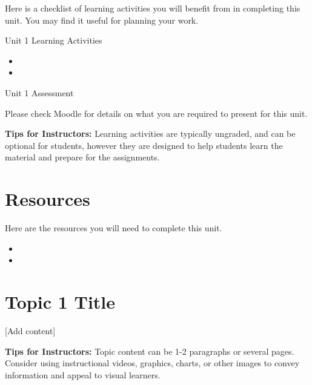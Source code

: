 \documentclass[
]{book}
\providecommand{\tightlist}{%
  \setlength{\itemsep}{0pt}\setlength{\parskip}{0pt}}
\begin{document}
Here is a checklist of learning activities you will benefit from in completing this unit. You may find it useful for planning your work.

\begin{reflect}
{Unit 1 Learning Activities }

\begin{itemize}
\tightlist
\item
\item
\end{itemize}
\end{reflect}

\begin{assessment}
{Unit 1 Assessment}

Please check Moodle for details on what you are required to present for this unit.
\end{assessment}

\begin{feedback}
\textbf{Tips for Instructors:}
Learning activities are typically ungraded, and can be optional for students, however they are designed to help students learn the material and prepare for the assignments.
\end{feedback}

\hypertarget{resources-2}{%
\section*{Resources}\label{resources-2}}

Here are the resources you will need to complete this unit.

\begin{itemize}
\tightlist
\item
\item
\end{itemize}

\hypertarget{topic-1-title}{%
\section{Topic 1 Title}\label{topic-1-title}}

{[}Add content{]}

\begin{feedback}
\textbf{Tips for Instructors:} Topic content can be 1-2 paragraphs or several pages. Consider using instructional videos, graphics, charts, or other images to convey information and appeal to visual learners.
\end{feedback}
\end{document}
